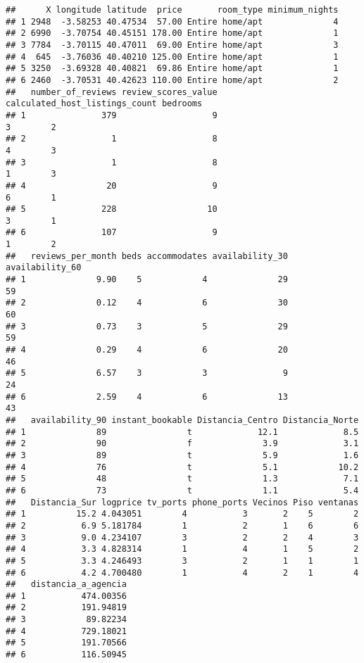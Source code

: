\documentclass[
]{article}
\begin{document}
\begin{verbatim}
##      X longitude latitude  price       room_type minimum_nights
## 1 2948  -3.58253 40.47534  57.00 Entire home/apt              4
## 2 6990  -3.70754 40.45151 178.00 Entire home/apt              1
## 3 7784  -3.70115 40.47011  69.00 Entire home/apt              3
## 4  645  -3.76036 40.40210 125.00 Entire home/apt              1
## 5 3250  -3.69328 40.40821  69.86 Entire home/apt              1
## 6 2460  -3.70531 40.42623 110.00 Entire home/apt              2
##   number_of_reviews review_scores_value calculated_host_listings_count bedrooms
## 1               379                   9                              3        2
## 2                 1                   8                              4        3
## 3                 1                   8                              1        3
## 4                20                   9                              6        1
## 5               228                  10                              3        1
## 6               107                   9                              1        2
##   reviews_per_month beds accommodates availability_30 availability_60
## 1              9.90    5            4              29              59
## 2              0.12    4            6              30              60
## 3              0.73    3            5              29              59
## 4              0.29    4            6              20              46
## 5              6.57    3            3               9              24
## 6              2.59    4            6              13              43
##   availability_90 instant_bookable Distancia_Centro Distancia_Norte
## 1              89                t             12.1             8.5
## 2              90                f              3.9             3.1
## 3              89                t              5.9             1.6
## 4              76                t              5.1            10.2
## 5              48                t              1.3             7.1
## 6              73                t              1.1             5.4
##   Distancia_Sur logprice tv_ports phone_ports Vecinos Piso ventanas
## 1          15.2 4.043051        4           3       2    5        2
## 2           6.9 5.181784        1           2       1    6        6
## 3           9.0 4.234107        3           2       2    4        3
## 4           3.3 4.828314        1           4       1    5        2
## 5           3.3 4.246493        3           2       1    1        1
## 6           4.2 4.700480        1           4       2    1        4
##   distancia_a_agencia
## 1           474.00356
## 2           191.94819
## 3            89.82234
## 4           729.18021
## 5           191.70566
## 6           116.50945
\end{verbatim}
\end{document}
